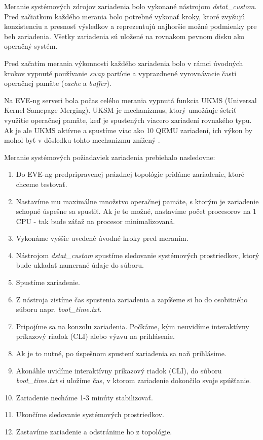 Meranie systémových zdrojov zariadenia bolo vykonané nástrojom \emph{dstat\_custom}. Pred začiatkom každého merania bolo potrebné vykonať kroky, ktoré zvyšujú konzistenciu a presnosť výsledkov a reprezentujú najhoršie možné podmienky pre beh zariadenia. Všetky zariadenia sú uložené na rovnakom pevnom disku ako operačný systém.

Pred začatím merania výkonnosti každého zariadenia bolo v rámci úvodných krokov vypnuté používanie \emph{swap} partície a vyprazdnené vyrovnávacie časti operačnej pamäte (\emph{cache} a \emph{buffer}).

Na EVE-ng serveri bola počas celého merania vypnutá funkcia UKMS (Universal Kernel Samepage Merging). UKSM je mechanizmus, ktorý umožňuje šetriť využitie operačnej pamäte, keď je spustených viacero zariadení rovnakého typu. Ak je ale UKMS aktívne a spustíme viac ako 10 QEMU zariadení, ich výkon by mohol byť v dôsledku tohto mechanizmu znížený \cite{eve_ng_faq}.

\noindent
Meranie systémových požiadaviek zariadenia prebiehalo nasledovne:

\begin{enumerate}[noitemsep]
    \item Do EVE-ng predpripravenej prázdnej topológie pridáme zariadenie, ktoré chceme testovať.
    \item \label{nastavenie_sys_param} Nastavíme mu maximálne množstvo operačnej pamäte, s ktorým je zariadenie schopné úspešne sa spustiť. Ak je to možné, nastavíme počet procesorov na 1 CPU - tak bude záťaž na procesor minimalizovaná.
    \item Vykonáme vyššie uvedené úvodné kroky pred meraním.
    \item Nástrojom \emph{dstat\_custom} spustíme sledovanie systémových prostriedkov, ktorý bude ukladať namerané údaje do súboru.
    \item Spustíme zariadenie.
    \item Z nástroja zistíme čas spustenia zariadenia a zapíšeme si ho do osobitného súboru napr. \emph{boot\_time.txt}.
    \item Pripojíme sa na konzolu zariadenia. Počkáme, kým neuvidíme interaktívny príkazový riadok (CLI) alebo výzvu na prihlásenie.
    \item Ak je to nutné, po úspešnom spustení zariadenia sa naň prihlásime.
    \item Akonáhle uvidíme interaktívny príkazový riadok (CLI), do súboru \emph{boot\_time.txt} si uložíme čas, v ktorom zariadenie dokončilo svoje spúšťanie. 
    \item Zariadenie necháme 1-3 minúty stabilizovať.
    \item Ukončíme sledovanie systémových prostriedkov.
    \item Zastavíme zariadenie a odstránime ho z topológie.
\end{enumerate}

